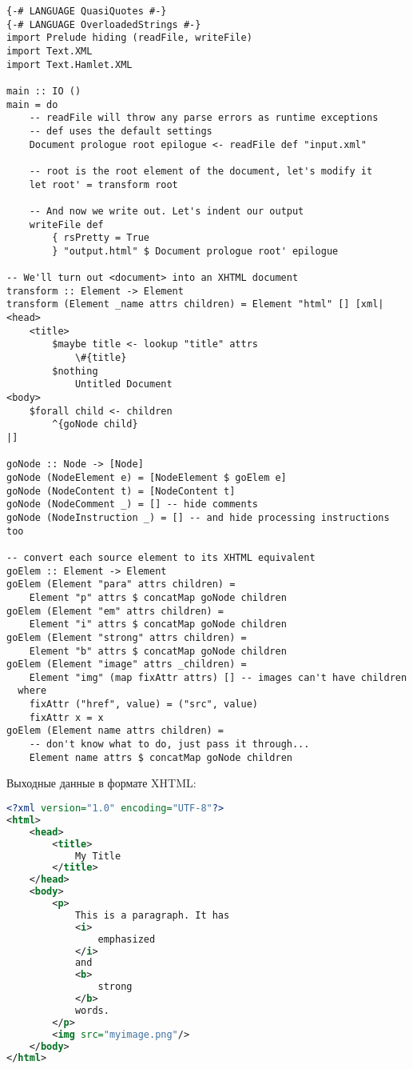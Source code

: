 \begin{lstlisting}
{-# LANGUAGE QuasiQuotes #-}
{-# LANGUAGE OverloadedStrings #-}
import Prelude hiding (readFile, writeFile)
import Text.XML
import Text.Hamlet.XML

main :: IO ()
main = do
    -- readFile will throw any parse errors as runtime exceptions
    -- def uses the default settings
    Document prologue root epilogue <- readFile def "input.xml"

    -- root is the root element of the document, let's modify it
    let root' = transform root

    -- And now we write out. Let's indent our output
    writeFile def
        { rsPretty = True
        } "output.html" $ Document prologue root' epilogue

-- We'll turn out <document> into an XHTML document
transform :: Element -> Element
transform (Element _name attrs children) = Element "html" [] [xml|
<head>
    <title>
        $maybe title <- lookup "title" attrs
            \#{title}
        $nothing
            Untitled Document
<body>
    $forall child <- children
        ^{goNode child}
|]

goNode :: Node -> [Node]
goNode (NodeElement e) = [NodeElement $ goElem e]
goNode (NodeContent t) = [NodeContent t]
goNode (NodeComment _) = [] -- hide comments
goNode (NodeInstruction _) = [] -- and hide processing instructions too

-- convert each source element to its XHTML equivalent
goElem :: Element -> Element
goElem (Element "para" attrs children) =
    Element "p" attrs $ concatMap goNode children
goElem (Element "em" attrs children) =
    Element "i" attrs $ concatMap goNode children
goElem (Element "strong" attrs children) =
    Element "b" attrs $ concatMap goNode children
goElem (Element "image" attrs _children) =
    Element "img" (map fixAttr attrs) [] -- images can't have children
  where
    fixAttr ("href", value) = ("src", value)
    fixAttr x = x
goElem (Element name attrs children) =
    -- don't know what to do, just pass it through...
    Element name attrs $ concatMap goNode children
\end{lstlisting}%

Выходные данные в формате XHTML:

\begin{lstlisting}[language=XML] % XHTML для lstlisting неизвестен
<?xml version="1.0" encoding="UTF-8"?>
<html>
    <head>
        <title>
            My Title
        </title>
    </head>
    <body>
        <p>
            This is a paragraph. It has 
            <i>
                emphasized
            </i>
            and 
            <b>
                strong
            </b>
            words.
        </p>
        <img src="myimage.png"/>
    </body>
</html>
\end{lstlisting}

